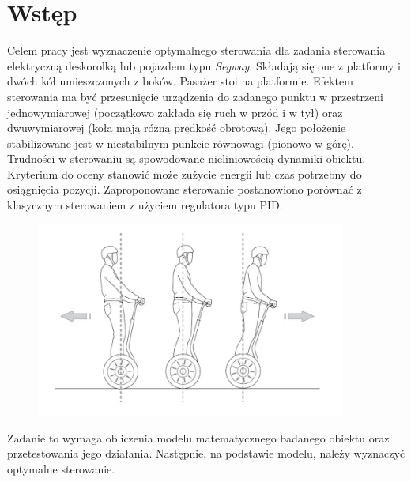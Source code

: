 \section{Wstęp}
\label{sec:wstep}

Celem pracy jest wyznaczenie optymalnego sterowania dla zadania sterowania elektryczną deskorolką lub pojazdem typu \textit{Segway}. Składają się one z platformy i dwóch kół umieszczonych z boków. Pasażer stoi na platformie. Efektem sterowania ma być przesunięcie urządzenia do zadanego punktu w przestrzeni jednowymiarowej (początkowo zakłada się ruch w przód i w tył) oraz dwuwymiarowej (koła mają różną prędkość obrotową). Jego położenie stabilizowane jest w niestabilnym punkcie równowagi (pionowo w górę). Trudności w sterowaniu są spowodowane nieliniowością dynamiki obiektu. Kryterium do oceny stanowić może zużycie energii lub czas potrzebny do osiągnięcia pozycji. Zaproponowane sterowanie postanowiono porównać z klasycznym sterowaniem z użyciem regulatora typu PID.

\begin{figure}[h]
	\centering
	\includegraphics[width=4in]{Figures/wstep_segway.jpg}
	\label{fig:wstep_segway}
\end{figure}

Zadanie to wymaga obliczenia modelu matematycznego badanego obiektu oraz przetestowania jego działania. Następnie, na podstawie modelu, należy wyznaczyć optymalne sterowanie.